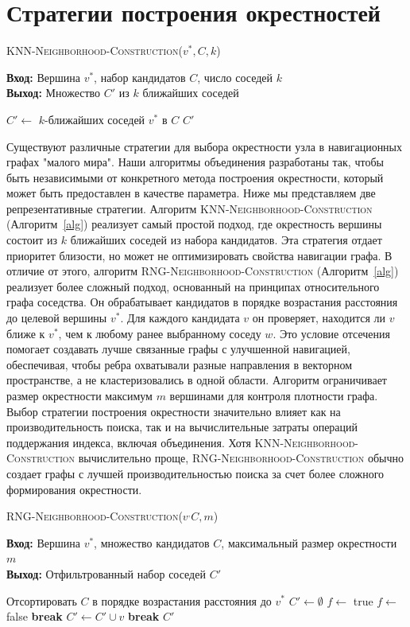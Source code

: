 \documentclass{article}
\begin{document}
\section{Стратегии построения окрестностей}
\begin{algorithm}
\caption{\textsc{KNN-Neighborhood-Construction}($v^*, C, k$)}
\label{alg}
\textbf{Вход:} Вершина $v^*$, набор кандидатов $C$, число соседей $k$ \\
\textbf{Выход:} Множество $C'$ из $k$ ближайших соседей
\begin{algorithmic}[1]
\State $C' \gets$ $k$-ближайших соседей $v^*$ в $C$
\State \Return $C'$
\end{algorithmic}
\end{algorithm}
Существуют различные стратегии для выбора окрестности узла в навигационных графах "малого мира". Наши алгоритмы объединения разработаны так, чтобы быть независимыми от конкретного метода построения окрестности, который может быть предоставлен в качестве параметра. Ниже мы представляем две репрезентативные стратегии.
Алгоритм \textsc{KNN-Neighborhood-Construction} (Алгоритм~\ref{alg}) реализует самый простой подход, где окрестность вершины состоит из $k$ ближайших соседей из набора кандидатов. Эта стратегия отдает приоритет близости, но может не оптимизировать свойства навигации графа.
В отличие от этого, алгоритм \textsc{RNG-Neighborhood-Construction} (Алгоритм~\ref{alg}) реализует более сложный подход, основанный на принципах относительного графа соседства. Он обрабатывает кандидатов в порядке возрастания расстояния до целевой вершины $v^*$. Для каждого кандидата $v$ он проверяет, находится ли $v$ ближе к $v^*$, чем к любому ранее выбранному соседу $w$. Это условие отсечения помогает создавать лучше связанные графы с улучшенной навигацией, обеспечивая, чтобы ребра охватывали разные направления в векторном пространстве, а не кластеризовались в одной области. Алгоритм ограничивает размер окрестности максимум $m$ вершинами для контроля плотности графа.
Выбор стратегии построения окрестности значительно влияет как на производительность поиска, так и на вычислительные затраты операций поддержания индекса, включая объединения. Хотя \textsc{KNN-Neighborhood-Construction} вычислительно проще, \textsc{RNG-Neighborhood-Construction} обычно создает графы с лучшей производительностью поиска за счет более сложного формирования окрестности.
\begin{algorithm}
\caption{\textsc{RNG-Neighborhood-Construction}($v^, C, m$)}\label{alg}
\textbf{Вход:} Вершина $v^*$, множество кандидатов $C$, максимальный размер окрестности $m$ \\
\textbf{Выход:} Отфильтрованный набор соседей $C'$
\begin{algorithmic}[1]
\State Отсортировать $C$ в порядке возрастания расстояния до $v^*$
\State $C' \gets \emptyset$
\State $f \gets$ true
\State $f \gets$ false
\State \textbf{break}
\EndIf
\EndFor
{}
\State $C' \gets C' \cup {v}$
\EndIf
{}
\State \textbf{break}
\EndIf
\EndFor
\State \Return $C'$
\end{algorithmic}
\end{algorithm}
\end{document}
